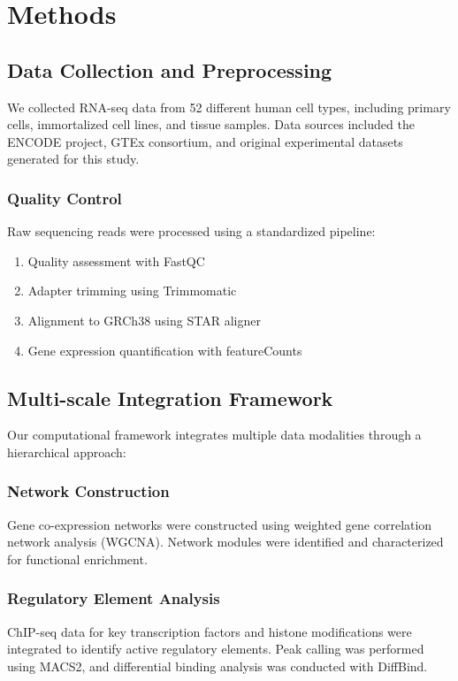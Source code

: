 \documentclass[11pt,a4paper]{article}
\begin{document}
\section{Methods}

\subsection{Data Collection and Preprocessing}

We collected RNA-seq data from 52 different human cell types, including primary cells, immortalized cell lines, and tissue samples. Data sources included the ENCODE project, GTEx consortium, and original experimental datasets generated for this study.

\subsubsection{Quality Control}
Raw sequencing reads were processed using a standardized pipeline:
\begin{enumerate}
\item Quality assessment with FastQC
\item Adapter trimming using Trimmomatic
\item Alignment to GRCh38 using STAR aligner
\item Gene expression quantification with featureCounts
\end{enumerate}

\subsection{Multi-scale Integration Framework}

Our computational framework integrates multiple data modalities through a hierarchical approach:

\subsubsection{Network Construction}
Gene co-expression networks were constructed using weighted gene correlation network analysis (WGCNA). Network modules were identified and characterized for functional enrichment.

\subsubsection{Regulatory Element Analysis}
ChIP-seq data for key transcription factors and histone modifications were integrated to identify active regulatory elements. Peak calling was performed using MACS2, and differential binding analysis was conducted with DiffBind.
\end{document}
